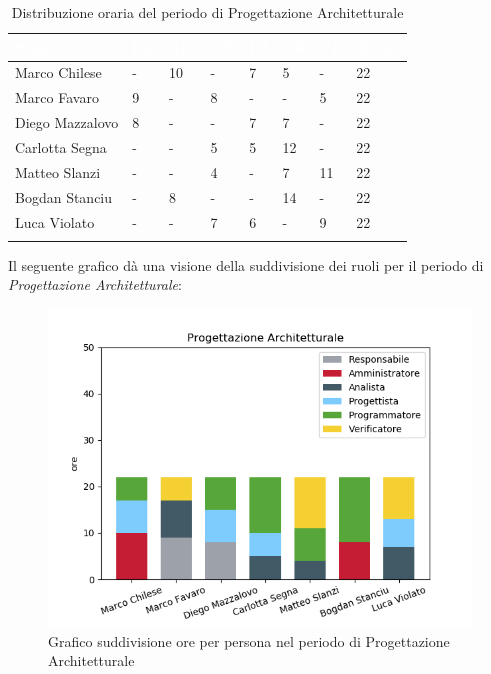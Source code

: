 \begin{longtable}{|C{.30\textwidth}|C{.06\textwidth}|C{.06\textwidth}|C{.06\textwidth} | C{.06\textwidth}| C{.06\textwidth} | C{.06\textwidth} | C{.10\textwidth} |}
\hline
{}	\textbf{\textcolor{white}{Nome}} & \textbf{\textcolor{white}{RE}} & \textbf{\textcolor{white}{AM}} & \textbf{\textcolor{white}{AN}} & \textbf{\textcolor{white}{PJ}} & \textbf{\textcolor{white}{PR}} & \textbf{\textcolor{white}{VE}} & \textbf{\textcolor{white}{Totale}}\\
\hline 
Marco Chilese & - & 10 & - & 7 & 5 & - & 22 \\
\hline
{}Marco Favaro & 9 & - & 8 & - & - & 5 & 22 \\
\hline
Diego Mazzalovo & 8 & - & - & 7 & 7 & - & 22 \\ 
\hline
{}Carlotta Segna & - & - & 5 & 5 & 12 & - & 22 \\
\hline
Matteo Slanzi & - & - & 4 & - & 7 & 11 & 22 \\
\hline
{}Bogdan Stanciu & - & 8 & - & - & 14 & - & 22 \\
\hline
Luca Violato & - & - & 7 & 6 & - & 9 & 22 \\
\hline 

\caption{Distribuzione oraria del periodo di Progettazione Architetturale}
\label{Distribuzione oraria del periodo di pa}
\end{longtable}

Il seguente grafico dà una visione della suddivisione dei ruoli per il periodo di \textit{Progettazione Architetturale}:

\begin{figure}[H]
	\centering
  		\includegraphics[width=1\linewidth]{./images/fig_pa.png}
  		\caption{Grafico suddivisione ore per persona nel periodo di Progettazione Architetturale}
  		\label{fig:grafico suddivione ruoli periodo di pa}
\end{figure}



